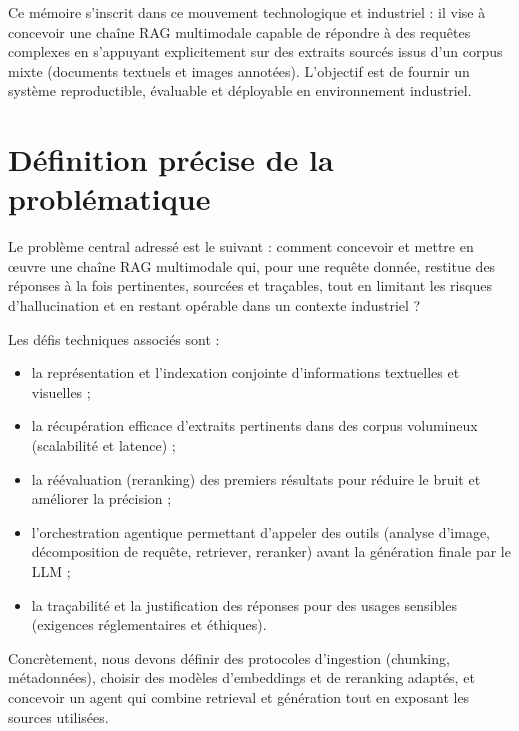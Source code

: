 \documentclass[12pt,a4paper]{report}
\begin{document}
Ce mémoire s'inscrit dans ce mouvement technologique et industriel : il vise à concevoir une chaîne RAG multimodale capable de répondre à des requêtes complexes en s'appuyant explicitement sur des extraits sourcés issus d'un corpus mixte (documents textuels et images annotées). L'objectif est de fournir un système reproductible, évaluable et déployable en environnement industriel.

\section{Définition précise de la problématique}
Le problème central adressé est le suivant : comment concevoir et mettre en œuvre une chaîne RAG multimodale qui, pour une requête donnée, restitue des réponses à la fois pertinentes, sourcées et traçables, tout en limitant les risques d'hallucination et en restant opérable dans un contexte industriel ?

Les défis techniques associés sont :
\begin{itemize}
  \item la représentation et l'indexation conjointe d'informations textuelles et visuelles ;
  \item la récupération efficace d'extraits pertinents dans des corpus volumineux (scalabilité et latence) ;
  \item la réévaluation (reranking) des premiers résultats pour réduire le bruit et améliorer la précision ;
  \item l'orchestration agentique permettant d'appeler des outils (analyse d'image, décomposition de requête, retriever, reranker) avant la génération finale par le LLM ;
  \item la traçabilité et la justification des réponses pour des usages sensibles (exigences réglementaires et éthiques).
\end{itemize}

Concrètement, nous devons définir des protocoles d'ingestion (chunking, métadonnées), choisir des modèles d'embeddings et de reranking adaptés, et concevoir un agent qui combine retrieval et génération tout en exposant les sources utilisées.
\end{document}

